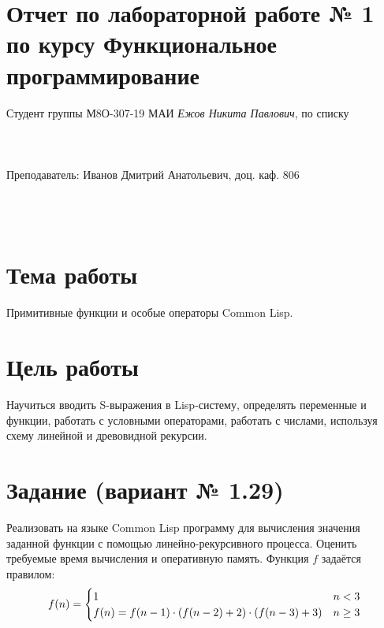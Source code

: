 \documentclass[12pt]{article}
\begin{document}
\section*{Отчет по лабораторной работе № 1 \\
по курсу \guillemotleft Функциональное программирование\guillemotright}
\begin{flushright}
Студент группы М8О-307-19 МАИ \textit{Ежов Никита Павлович},  по списку \\
 \\
 \\
\ \\
Преподаватель: Иванов Дмитрий Анатольевич, доц. каф. 806 \\
 \\
 \\
 \\

\end{flushright}

\section{Тема работы}
Примитивные функции и особые операторы Common Lisp.

\section{Цель работы}
Научиться вводить S-выражения в Lisp-систему, определять переменные и функции, работать с условными операторами, работать с числами, используя схему линейной и древовидной рекурсии.

\section{Задание (вариант № 1.29)}
Реализовать на языке Common Lisp программу для вычисления значения заданной функции с помощью линейно-рекурсивного процесса. Оценить требуемые время вычисления и оперативную память.
Функция $f$ задаётся правилом:
\begin{equation}
	f(n) = 
	 \begin{cases}
	   1 & $$n < 3$$\\
	   $$f(n) = f(n-1) \cdot (f(n-2)+2) \cdot (f(n-3)+3)$$ & $$n \geq 3$$
	 \end{cases}
\end{equation}
\end{document}
